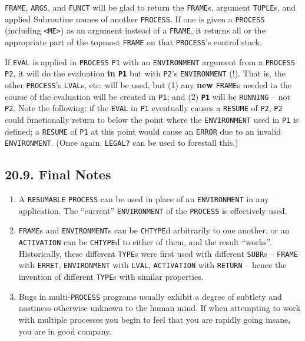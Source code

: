 \documentclass[a4paper,]{article}
\providecommand{\tightlist}{%
  \setlength{\itemsep}{0pt}\setlength{\parskip}{0pt}}
\begin{document}
\texttt{FRAME}, \texttt{ARGS}, and \texttt{FUNCT} will be glad to return the
\texttt{FRAME}s, argument \texttt{TUPLE}s, and applied Subroutine names of another \texttt{PROCESS}. If one is given a
\texttt{PROCESS} (including \texttt{\textless{}ME\textgreater{}}) as an argument instead of a \texttt{FRAME}, it returns
all or the appropriate part of the topmost \texttt{FRAME} on that \texttt{PROCESS}'s control stack.

If \texttt{EVAL} is applied in \texttt{PROCESS} \texttt{P1} with an \texttt{ENVIRONMENT} argument from a \texttt{PROCESS}
\texttt{P2}, it will do the evaluation \textbf{in \texttt{P1}} but with \texttt{P2}'s \texttt{ENVIRONMENT} (!). That is,
the other \texttt{PROCESS}'s \texttt{LVAL}s, etc. will be used, but (1) any \textbf{new} \texttt{FRAME}s needed in the
course of the evaluation will be created in \texttt{P1}; and (2) \textbf{\texttt{P1}} will be \texttt{RUNNING} -- not
\texttt{P2}. Note the following: if the \texttt{EVAL} in \texttt{P1} eventually causes a \texttt{RESUME} of \texttt{P2},
\texttt{P2} could functionally return to below the point where the \texttt{ENVIRONMENT} used in \texttt{P1} is defined; a
\texttt{RESUME} of \texttt{P1} at this point would cause an \texttt{ERROR} due to an invalid \texttt{ENVIRONMENT}. (Once
again, \texttt{LEGAL?} can be used to forestall this.)

\subsection{20.9. Final Notes}\label{final-notes}

\begin{enumerate}
\def\labelenumi{\arabic{enumi}.}
\tightlist
\item
  A \texttt{RESUMABLE} \texttt{PROCESS} can be used in place of an \texttt{ENVIRONMENT} in any application. The ``current''
  \texttt{ENVIRONMENT} of the \texttt{PROCESS} is effectively used.
\item
  \texttt{FRAME}s and \texttt{ENVIRONMENT}s can be \texttt{CHTYPE}d arbitrarily to one another, or an \texttt{ACTIVATION}
  can be \texttt{CHTYPE}d to either of them, and the result ``works''. Historically, these different \texttt{TYPE}s were
  first used with different \texttt{SUBR}s -- \texttt{FRAME} with \texttt{ERRET}, \texttt{ENVIRONMENT} with \texttt{LVAL},
  \texttt{ACTIVATION} with \texttt{RETURN} -- hence the invention of different \texttt{TYPE}s with similar properties.
\item
  Bugs in multi-\texttt{PROCESS} programs usually exhibit a degree of subtlety and nastiness otherwise unknown to the human
  mind. If when attempting to work with multiple processes you begin to feel that you are rapidly going insane, you are in
  good company.
\end{enumerate}
\end{document}
